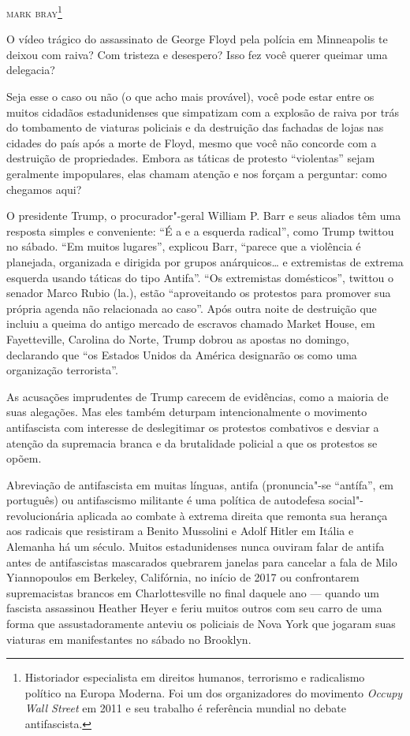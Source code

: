 \hfill{}\textsc{mark bray\footnote{Historiador especialista em direitos humanos, terrorismo e radicalismo político na Europa Moderna. Foi um dos organizadores do movimento \emph{Occupy Wall Street} em 2011 e seu trabalho é referência mundial no debate antifascista.}}

\bigskip

O vídeo trágico do assassinato de George Floyd pela polícia em Minneapolis te deixou com raiva? Com tristeza e desespero? Isso fez você querer queimar uma delegacia?
 
Seja esse o caso ou não (o que acho mais provável), você pode estar entre os muitos cidadãos estadunidenses que simpatizam com a explosão de raiva por trás do tombamento de viaturas policiais e da destruição das fachadas de lojas nas cidades do país após a morte de Floyd, mesmo que você não concorde com a destruição de propriedades. Embora as táticas de protesto ``violentas'' sejam geralmente impopulares, elas chamam atenção e nos forçam a perguntar: como chegamos aqui?

O presidente Trump, o procurador"-geral William P. Barr e seus aliados têm uma resposta simples e conveniente: ``É a  e a esquerda radical'', como Trump twittou no sábado. ``Em muitos lugares'', explicou Barr, ``parece que a violência é planejada, organizada e dirigida por grupos anárquicos\ldots{} e extremistas de extrema esquerda usando táticas do tipo Antifa''. ``Os extremistas domésticos'', twittou o senador Marco Rubio (la.), estão ``aproveitando os protestos para promover sua própria agenda não relacionada ao caso''. Após outra noite de destruição que incluiu a queima do antigo mercado de escravos chamado Market House, em Fayetteville, Carolina do Norte, Trump dobrou as apostas no domingo, declarando que ``os Estados Unidos da América designarão os  como uma organização terrorista''.
 
As acusações imprudentes de Trump carecem de evidências, como a maioria de suas alegações. Mas eles também deturpam intencionalmente o movimento antifascista com interesse de deslegitimar os protestos combativos e desviar a atenção da supremacia branca e da brutalidade policial a que os protestos se opõem.
 
Abreviação de antifascista em muitas línguas, antifa (pronuncia"-se ``antífa'', em português) ou antifascismo militante é uma política de autodefesa social"-revolucionária aplicada ao combate à extrema direita que remonta sua herança aos radicais que resistiram a Benito Mussolini e Adolf Hitler em Itália e Alemanha há um século. Muitos estadunidenses nunca ouviram falar de antifa antes de antifascistas mascarados quebrarem janelas para cancelar a fala de Milo Yiannopoulos em Berkeley, Califórnia, no início de 2017 ou confrontarem supremacistas brancos em Charlottesville no final daquele ano — quando um fascista assassinou Heather Heyer e feriu muitos outros com seu carro de uma forma que assustadoramente anteviu os policiais de Nova York que jogaram suas viaturas em manifestantes no sábado no Brooklyn.

